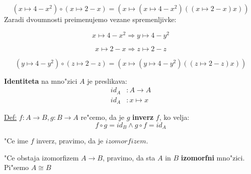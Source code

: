 \[(x \mapsto 4 - x^2)\circ(x \mapsto 2 - x)  = (x \mapsto (x\mapsto4-x^2)((x \mapsto 2-x)x))\]
Zaradi dvoumnosti preimenujemo vezane spremenljivke:
\begin{multicols}{2}
	\[x \mapsto 4 - x^2 \Rightarrow y \mapsto 4-y^2\]
	
	\columnbreak
	\[x \mapsto 2 - x \Rightarrow z \mapsto 2 - z\]
\end{multicols}
\[(y \mapsto 4 - y^2)\circ(z \mapsto 2 - z)  = (x \mapsto (y\mapsto4-y^2)((z \mapsto 2-z)x))\]

\textbf{Identiteta} na mno"zici \(A\) je preslikava:
\begin{align*}
	id_A&: A \rightarrow A\\
	id_A&: x \mapsto x
\end{align*}

\underline{Def:} \(f: A \rightarrow B, g: B \rightarrow A\) re"cemo, da je \(g\) \textbf{inverz} \(f\), ko velja:
\[f \circ g = id_B \land g \circ f = id_A\]

"Ce ime \(f\) inverz, pravimo, da je \(izomorfizem.\)

"Ce obstaja izomorfizem \(A \rightarrow B\), pravimo, da sta \(A\) in \(B\) \textbf{izomorfni} mno"zici. Pi"semo \(A \cong B\)       

